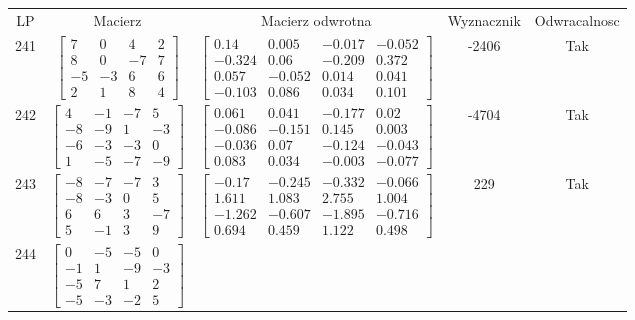 \documentclass[a4paper,12pt]{article}
\begin{document}
\bgroup {} \vspace{0.2in} \begin{tabular}{c c c c c}
LP & Macierz & Macierz odwrotna & Wyznacznik & Odwracalnosc\\
241
&
$\begin{bmatrix} 7 & 0 & 4 & 2 \\ 8 & 0 & -7 & 7 \\ -5 & -3 & 6 & 6 \\ 2 & 1 & 8 & 4 \end{bmatrix}$
&
$\begin{bmatrix} 0.14 & 0.005 & -0.017 & -0.052 \\ -0.324 & 0.06 & -0.209 & 0.372 \\ 0.057 & -0.052 & 0.014 & 0.041 \\ -0.103 & 0.086 & 0.034 & 0.101 \end{bmatrix}$
&
-2406
&
Tak
\\
242
&
$\begin{bmatrix} 4 & -1 & -7 & 5 \\ -8 & -9 & 1 & -3 \\ -6 & -3 & -3 & 0 \\ 1 & -5 & -7 & -9 \end{bmatrix}$
&
$\begin{bmatrix} 0.061 & 0.041 & -0.177 & 0.02 \\ -0.086 & -0.151 & 0.145 & 0.003 \\ -0.036 & 0.07 & -0.124 & -0.043 \\ 0.083 & 0.034 & -0.003 & -0.077 \end{bmatrix}$
&
-4704
&
Tak
\\
243
&
$\begin{bmatrix} -8 & -7 & -7 & 3 \\ -8 & -3 & 0 & 5 \\ 6 & 6 & 3 & -7 \\ 5 & -1 & 3 & 9 \end{bmatrix}$
&
$\begin{bmatrix} -0.17 & -0.245 & -0.332 & -0.066 \\ 1.611 & 1.083 & 2.755 & 1.004 \\ -1.262 & -0.607 & -1.895 & -0.716 \\ 0.694 & 0.459 & 1.122 & 0.498 \end{bmatrix}$
&
229
&
Tak
\\
244
&
$\begin{bmatrix} 0 & -5 & -5 & 0 \\ -1 & 1 & -9 & -3 \\ -5 & 7 & 1 & 2 \\ -5 & -3 & -2 & 5 \end{bmatrix}$

\end{tabular}
\end{document}
